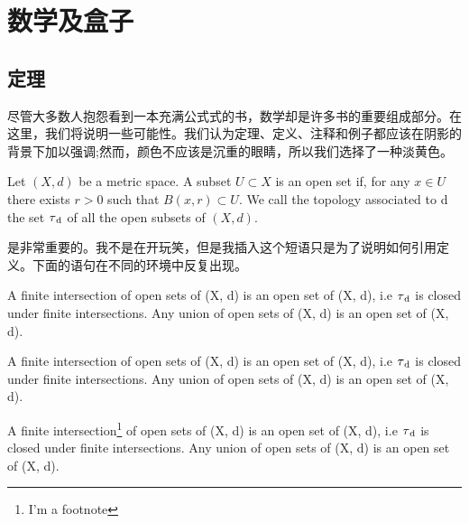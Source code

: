 \setchapterpreamble[u]{\margintoc}
\chapter{数学及盒子}

\section{定理}

尽管大多数人抱怨看到一本充满公式式的书，数学却是许多书的重要组成部分。在这里，我们将说明一些可能性。我们认为定理、定义、注释和例子都应该在阴影的背景下加以强调;然而，颜色不应该是沉重的眼睛，所以我们选择了一种淡黄色。

\begin{definition}
Let $(X, d)$ be a metric space. A subset $U \subset X$ is an open set 
if, for any $x \in U$ there exists $r > 0$ such that $B(x, r) \subset 
U$. We call the topology associated to d the set $\tau\textsubscript{d}$ 
of all the open subsets of $(X, d).$
\end{definition}

 是非常重要的。我不是在开玩笑，但是我插入这个短语只是为了说明如何引用定义。下面的语句在不同的环境中反复出现。

\begin{theorem}
A finite intersection of open sets of (X, d) is an open set of (X, d), 
i.e $\tau\textsubscript{d}$ is closed under finite intersections. Any 
union of open sets of (X, d) is an open set of (X, d).
\end{theorem}

\begin{proposition}
A finite intersection of open sets of (X, d) is an open set of (X, d), 
i.e $\tau\textsubscript{d}$ is closed under finite intersections. Any 
union of open sets of (X, d) is an open set of (X, d).
\end{proposition}


\begin{lemma}
A finite intersection\footnote{I'm a footnote} of open sets of (X, d) is 
an open set of (X, d), i.e $\tau\textsubscript{d}$ is closed under 
finite intersections. Any union of open sets of (X, d) is an open set of 
(X, d).
\end{lemma}

